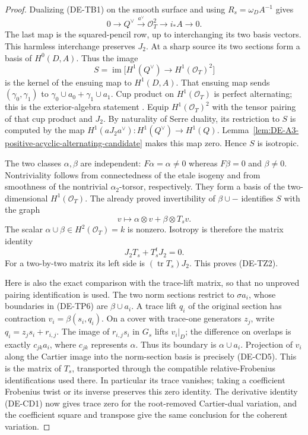 \begin{proof}
Dualizing (DE-TB1) on the smooth surface and using
$R_s=\omega_D A^{-1}$ gives
\[
 0\longrightarrow Q^\vee\xrightarrow{a^\vee}\mathcal O_T^2
                         \longrightarrow i_*A\longrightarrow0.
                                                               \tag{DE-TZ3}
\]
The last map is the squared-pencil row, up to interchanging its two
basis vectors. This harmless interchange preserves $J_2$.
At a sharp source its two sections form a basis of $H^0(D,A)$.
Thus the image
\[
 S=\operatorname{im}\bigl[H^1(Q^\vee)
                              \longrightarrow H^1(\mathcal O_T)^2\bigr]
\]
is the kernel of the ensuing map to $H^1(D,A)$. That ensuing map
sends $(\gamma_0,\gamma_1)$ to $\gamma_0\cup a_0+\gamma_1\cup a_1$.
Cup product on $H^1(\mathcal O_T)$ is perfect alternating; this is
the exterior-algebra statement
\cite[Proposition~7.27, p.~108, with Corollary~6.13 and its proof,
pp.~93--94]{EdixhovenVanDerGeerMoonenAV}.
Equip $H^1(\mathcal O_T)^2$ with the tensor pairing of that cup
product and $J_2$. By naturality of Serre duality, its restriction
to $S$ is computed by the map
$H^1(aJ_2a^\vee):H^1(Q^\vee)\to H^1(Q)$.
Lemma~\ref{lem:DE-A3-positive-acyclic-alternating-candidate} makes
this map zero. Hence $S$ is isotropic.

The two classes $\alpha,\beta$ are independent: $F\alpha=\alpha\ne0$
whereas $F\beta=0$ and $\beta\ne0$. Nontriviality follows from
connectedness of the etale isogeny and from smoothness of the
nontrivial $\alpha_2$-torsor, respectively. They form a basis of
the two-dimensional $H^1(\mathcal O_T)$. The already proved
invertibility of $\beta\cup-$ identifies $S$ with the graph
\[
                  v\longmapsto\alpha\otimes v
                                      +\beta\otimes T_s v.
\]
The scalar $\alpha\cup\beta\in H^2(\mathcal O_T)=k$ is nonzero.
Isotropy is therefore the matrix identity
\[
                         J_2T_s+T_s^tJ_2=0.
\]
For a two-by-two matrix its left side is
$(\operatorname{tr}T_s)J_2$. This proves (DE-TZ2).

Here is also the exact comparison with the trace-lift matrix, so
that no unproved pairing identification is used. The two norm sections
restrict to $\sigma a_i$, whose boundaries in (DE-TP6) are
$\beta\cup a_i$. A trace lift $q_i$ of the original section has
contraction $v_i=\beta(s_i,q_i)$. On a cover with trace-one generators
$z_j$, write $q_i=z_j s_i+r_{i,j}$. The image of $r_{i,j}s_i$ in
$G_s$ lifts $v_i|_D$; the difference on overlaps is exactly
$c_{jk}a_i$, where $c_{jk}$ represents $\alpha$.
Thus its boundary is $\alpha\cup a_i$. Projection of $v_i$ along
the Cartier image into the norm-section basis is precisely (DE-CD5).
This is the matrix of $T_s$, transported through the compatible
relative-Frobenius identifications used there. In particular its
trace vanishes; taking a coefficient Frobenius twist or its inverse
preserves this zero identity. The derivative identity (DE-CD1) now
gives trace zero for the root-removed Cartier-dual variation, and
the coefficient square and transpose give the same conclusion for
the coherent variation.
\end{proof}

